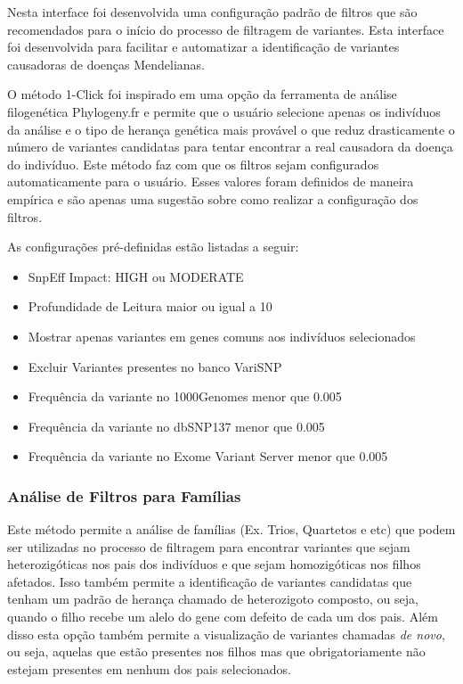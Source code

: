 Nesta interface foi desenvolvida uma configuração padrão de filtros que são recomendados para o início do processo de filtragem de variantes. Esta interface foi desenvolvida para facilitar e automatizar a identificação de variantes causadoras de doenças Mendelianas.

O método 1-Click foi inspirado em uma opção da ferramenta de análise filogenética Phylogeny.fr e permite que o usuário selecione apenas os indivíduos da análise e o tipo de herança genética mais provável o que reduz drasticamente o número de variantes candidatas para tentar encontrar a real causadora da doença do indivíduo. Este método faz com que os filtros sejam configurados automaticamente para o usuário. Esses valores foram definidos de maneira empírica e são apenas uma sugestão sobre como realizar a configuração dos filtros.

As configurações pré-definidas estão listadas a seguir:

\begin{itemize}
  \item SnpEff Impact: HIGH ou MODERATE
  \item Profundidade de Leitura maior ou igual a 10
  \item Mostrar apenas variantes em genes comuns aos indivíduos selecionados
  \item Excluir Variantes presentes no banco VariSNP
  \item Frequência da variante no 1000Genomes menor que 0.005
  \item Frequência da variante no dbSNP137 menor que 0.005
  \item Frequência da variante no Exome Variant Server menor que 0.005
\end{itemize}

\subsubsection{Análise de Filtros para Famílias}

Este método permite a análise de famílias (Ex. Trios, Quartetos e etc) que podem ser utilizadas no processo de filtragem para encontrar variantes que sejam heterozigóticas nos pais dos indivíduos e que sejam homozigóticas nos filhos afetados. Isso também permite a identificação de variantes candidatas que tenham um padrão de herança chamado de heterozigoto composto, ou seja, quando o filho recebe um alelo do gene com defeito de cada um dos pais. Além disso esta opção também permite a visualização de variantes chamadas \textit{de novo}, ou seja, aquelas que estão presentes nos filhos mas que obrigatoriamente não estejam presentes em nenhum dos pais selecionados.

